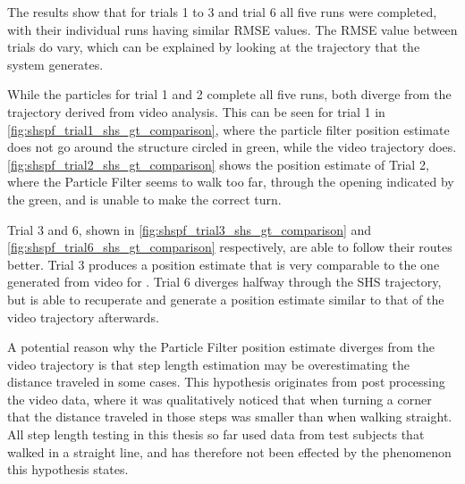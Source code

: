 The results show that for trials 1 to 3 and trial 6 all five runs were completed, with their individual runs having similar RMSE values. The RMSE value between trials do vary, which can be explained by looking at the trajectory that the system generates. \par  

While the particles for trial 1 and 2 complete all five runs, both diverge from the trajectory derived from video analysis. This can be seen for trial 1 in  \cref{fig:shspf_trial1_shs_gt_comparison}, where the particle filter position estimate does not go around the structure circled in green, while the video trajectory does. \cref{fig:shspf_trial2_shs_gt_comparison} shows the position estimate of Trial 2, where the Particle Filter seems to walk too far, through the opening indicated by the green,  and is unable to make the correct turn. \par 

Trial 3 and 6, shown in \cref{fig:shspf_trial3_shs_gt_comparison} and \cref{fig:shspf_trial6_shs_gt_comparison} respectively, are able to follow their routes better. Trial 3 produces a position estimate that is very comparable to the one generated from video for . Trial 6 diverges halfway through the SHS trajectory, but is able to recuperate and generate a position estimate similar to that of the video trajectory afterwards.

A potential reason why the Particle Filter position estimate diverges from the video trajectory is that step length estimation may be overestimating the distance traveled in some cases. This hypothesis originates from post processing the video data, where it was qualitatively noticed that when turning a corner that the distance traveled in those steps was smaller than when walking straight. All step length testing in this thesis so far used data from test subjects that walked in a straight line, and has therefore not been effected by the phenomenon this hypothesis states.\par 



